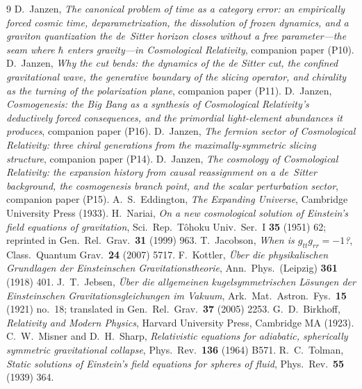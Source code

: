 \documentclass[11pt,a4paper]{article}
\theoremstyle{definition}
\begin{document}
\begin{thebibliography}{9}
 D.~Janzen, \emph{The canonical problem of time as a category error: an empirically forced cosmic time, deparametrization, the dissolution of frozen dynamics, and a graviton quantization the de~Sitter horizon closes without a free parameter---the seam where $\hbar$ enters gravity---in Cosmological Relativity}, companion paper (P10).
 D.~Janzen, \emph{Why the cut bends: the dynamics of the de Sitter cut, the confined gravitational wave, the generative boundary of the slicing operator, and chirality as the turning of the polarization plane}, companion paper (P11).
 D.~Janzen, \emph{Cosmogenesis: the Big Bang as a synthesis of Cosmological Relativity's deductively forced consequences, and the primordial light-element abundances it produces}, companion paper (P16).
 D.~Janzen, \emph{The fermion sector of Cosmological Relativity: three chiral generations from the maximally-symmetric slicing structure}, companion paper (P14).
 D.~Janzen, \emph{The cosmology of Cosmological Relativity: the expansion history from causal reassignment on a de~Sitter background, the cosmogenesis branch point, and the scalar perturbation sector}, companion paper (P15).
 A.~S.~Eddington, \emph{The Expanding Universe}, Cambridge University Press (1933).
 H.~Nariai, \emph{On a new cosmological solution of Einstein's field equations of gravitation}, Sci.\ Rep.\ T\^ohoku Univ.\ Ser.\ I \textbf{35} (1951) 62; reprinted in Gen.\ Rel.\ Grav.\ \textbf{31} (1999) 963.
 T.~Jacobson, \emph{When is $g_{tt}g_{rr}=-1$?}, Class.\ Quantum Grav.\ \textbf{24} (2007) 5717.
 F.~Kottler, \emph{\"Uber die physikalischen Grundlagen der Einsteinschen Gravitationstheorie}, Ann.\ Phys.\ (Leipzig) \textbf{361} (1918) 401.
 J.~T.~Jebsen, \emph{\"Uber die allgemeinen kugelsymmetrischen L\"osungen der Einsteinschen Gravitationsgleichungen im Vakuum}, Ark.\ Mat.\ Astron.\ Fys.\ \textbf{15} (1921) no.~18; translated in Gen.\ Rel.\ Grav.\ \textbf{37} (2005) 2253.
 G.~D.~Birkhoff, \emph{Relativity and Modern Physics}, Harvard University Press, Cambridge MA (1923).
 C.~W.~Misner and D.~H.~Sharp, \emph{Relativistic equations for adiabatic, spherically symmetric gravitational collapse}, Phys.\ Rev.\ \textbf{136} (1964) B571.
 R.~C.~Tolman, \emph{Static solutions of Einstein's field equations for spheres of fluid}, Phys.\ Rev.\ \textbf{55} (1939) 364.

\end{thebibliography}
\end{document}
